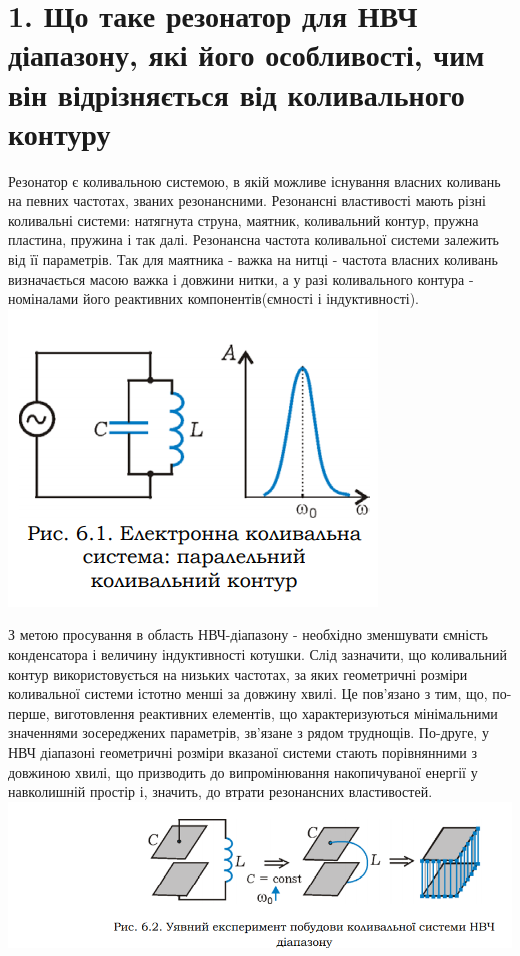 \documentclass[a4paper,14pt]{extreport}
\begin{document}
\section{1. Що таке резонатор для НВЧ діапазону, які його особливості, чим він відрізняється від коливального контуру}
Резонатор є коливальною системою, в якій можливе
існування власних коливань на певних частотах, званих
резонансними. Резонансні властивості мають різні коливальні
системи: натягнута струна, маятник, коливальний контур,
пружна пластина, пружина і так далі. Резонансна частота
коливальної системи залежить від її параметрів. Так для
маятника - важка на нитці - частота власних коливань
визначається масою важка і довжини нитки, а у разі
коливального контура - номіналами його реактивних
компонентів(ємності і індуктивності).
\includegraphics[scale=0.9]{5.png}\par
З метою просування в область НВЧ-діапазону - необхідно зменшувати
ємність конденсатора і величину індуктивності котушки. Слід зазначити, що коливальний контур використовується на низьких
частотах, за яких геометричні розміри коливальної системи істотно
менші за довжину хвилі. Це пов'язано з тим, що, по-перше,
виготовлення реактивних елементів, що характеризуються
мінімальними значеннями зосереджених параметрів, зв'язане з
рядом труднощів. По-друге, у НВЧ діапазоні геометричні розміри
вказаної системи стають порівнянними з довжиною хвилі, що
призводить до випромінювання накопичуваної енергії у навколишній
простір і, значить, до втрати резонансних властивостей.
\includegraphics[scale=0.9]{6.png}\par
\end{document}

